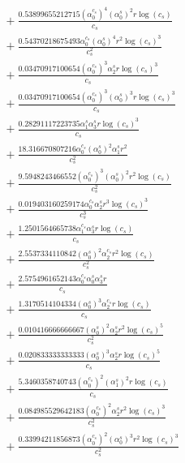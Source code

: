 \documentclass[10pt]{article}
\begin{document}
\begin{align*}
&{}  + \frac{0.53899655212715 \left(\alpha_{0}^{c_s}\right)^{4} \left(\alpha_{0}^s\right)^{2} r \log{\left(c_{s} \right)}}{c_{s}} \\
&{}  + \frac{0.54370218675493 \alpha_{0}^{c_s} \left(\alpha_{0}^s\right)^{4} r^{2} \log{\left(c_{s} \right)}^{3}}{c_{s}^{2}} \\
&{}  + \frac{0.03470917100654 \left(\alpha_{0}^{c_s}\right)^{3} \alpha_{2}^s r \log{\left(c_{s} \right)}^{3}}{c_{s}} \\
&{}  + \frac{0.03470917100654 \left(\alpha_{0}^{c_s}\right)^{3} \left(\alpha_{0}^s\right)^{3} r \log{\left(c_{s} \right)}^{3}}{c_{s}} \\
&{}  + \frac{0.28291117223735 \alpha_{1}^s \alpha_{3}^s r \log{\left(c_{s} \right)}^{3}}{c_{s}} \\
&{}  + \frac{18.316670807216 \alpha_{0}^{c_s} \left(\alpha_{0}^s\right)^{2} \alpha_{1}^s r^{2}}{c_{s}^{2}} \\
&{}  + \frac{9.5948243466552 \left(\alpha_{0}^{c_s}\right)^{3} \left(\alpha_{0}^s\right)^{2} r^{2} \log{\left(c_{s} \right)}}{c_{s}^{2}} \\
&{}  + \frac{0.019403160259174 \alpha_{0}^{c_s} \alpha_{2}^s r^{3} \log{\left(c_{s} \right)}^{3}}{c_{s}^{3}} \\
&{}  + \frac{1.2501564665738 \alpha_{1}^{c_s} \alpha_{3}^s r \log{\left(c_{s} \right)}}{c_{s}} \\
&{}  + \frac{2.5537334110842 \left(\alpha_{0}^s\right)^{2} \alpha_{2}^{c_s} r^{2} \log{\left(c_{s} \right)}}{c_{s}^{2}} \\
&{}  + \frac{2.5754961652143 \alpha_{0}^{c_s} \alpha_{0}^s \alpha_{3}^s r}{c_{s}} \\
&{}  + \frac{1.3170514104334 \left(\alpha_{0}^s\right)^{3} \alpha_{2}^{c_s} r \log{\left(c_{s} \right)}}{c_{s}} \\
&{}  + \frac{0.010416666666667 \left(\alpha_{0}^s\right)^{2} \alpha_{2}^s r^{2} \log{\left(c_{s} \right)}^{5}}{c_{s}^{2}} \\
&{}  + \frac{0.020833333333333 \left(\alpha_{0}^s\right)^{3} \alpha_{2}^s r \log{\left(c_{s} \right)}^{5}}{c_{s}} \\
&{}  + \frac{5.3460358740743 \left(\alpha_{0}^{c_s}\right)^{2} \left(\alpha_{1}^s\right)^{2} r \log{\left(c_{s} \right)}}{c_{s}} \\
&{}  + \frac{0.084985529642183 \left(\alpha_{0}^{c_s}\right)^{2} \alpha_{2}^s r^{2} \log{\left(c_{s} \right)}^{3}}{c_{s}^{2}} \\
&{}  + \frac{0.33994211856873 \left(\alpha_{0}^{c_s}\right)^{2} \left(\alpha_{0}^s\right)^{3} r^{2} \log{\left(c_{s} \right)}^{3}}{c_{s}^{2}} \\

\end{align*}
\end{document}
